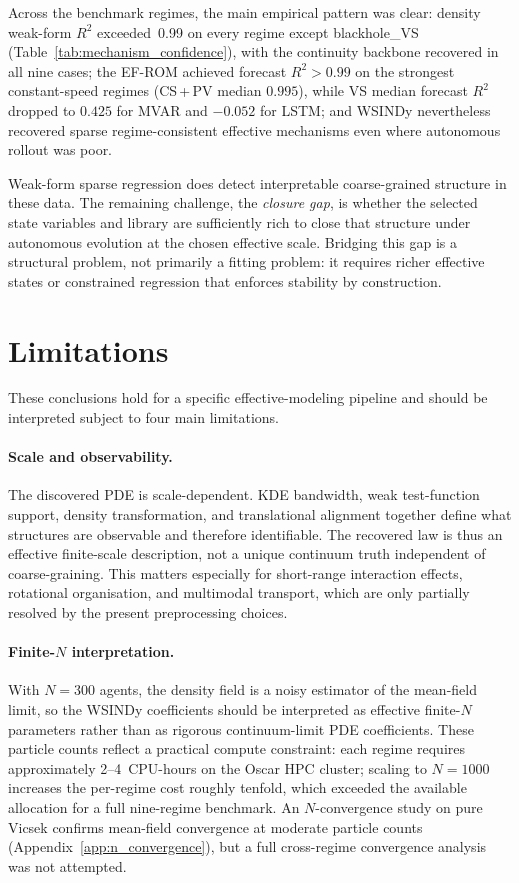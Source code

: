 Across the benchmark regimes, the main empirical pattern was clear:
density weak-form $R^2$ exceeded~0.99 on every regime except
blackhole\_VS (Table~\ref{tab:mechanism_confidence}), with
the continuity backbone recovered in all nine cases;
the EF-ROM achieved forecast $R^2>0.99$ on the strongest constant-speed
regimes (CS\,+\,PV median $0.995$), while VS median forecast $R^2$
dropped to $0.425$ for MVAR and $-0.052$ for LSTM; and WSINDy
nevertheless recovered sparse regime-consistent effective mechanisms even
where autonomous rollout was poor.

Weak-form sparse regression does detect interpretable coarse-grained
structure in these data.  The remaining challenge, the \emph{closure gap}, is whether
the selected state variables and library are sufficiently rich to close
that structure under autonomous evolution at the chosen effective scale.
Bridging this gap is a structural problem, not primarily a fitting
problem: it requires richer effective states or constrained regression
that enforces stability by construction.

\section{Limitations}
\label{sec:limitations}

These conclusions hold for a specific effective-modeling pipeline and should
be interpreted subject to four main limitations.

\paragraph{Scale and observability.}
The discovered PDE is scale-dependent.  KDE bandwidth, weak test-function
support, density transformation, and translational alignment together define
what structures are observable and therefore identifiable.  The recovered law
is thus an effective finite-scale description, not a unique continuum truth
independent of coarse-graining.  This matters especially for short-range
interaction effects, rotational organisation, and multimodal transport,
which are only partially resolved by the present preprocessing choices.

\paragraph{Finite-$N$ interpretation.}
With $N{=}300$ agents, the density
field is a noisy estimator of the mean-field limit, so the WSINDy
coefficients should be interpreted as effective finite-$N$ parameters
rather than as rigorous continuum-limit PDE coefficients.  These particle
counts reflect a practical compute constraint: each regime requires
approximately 2--4~CPU-hours on the Oscar HPC cluster; scaling to
$N{=}1000$ increases the per-regime cost roughly tenfold, which exceeded
the available allocation for a full nine-regime benchmark.
An $N$-convergence study on pure Vicsek confirms mean-field
convergence at moderate particle counts (Appendix~\ref{app:n_convergence}),
but a full cross-regime convergence analysis was not attempted.

